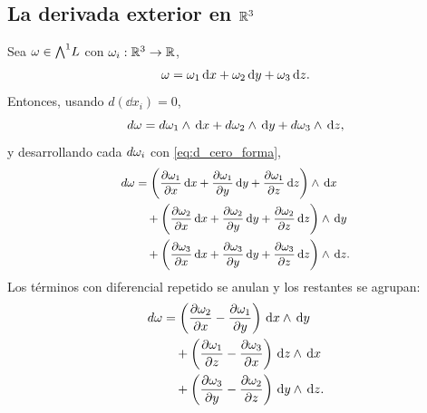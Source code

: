 \subsection{La derivada exterior en $\R^3$}
\label{subsec:derivada_exterior}

Sea $\om\in\Ext{1}$ con $\om_i:\R^3\rightarrow\R$,
\begin{equation}
  \label{eq:uno_forma}
  \om=\om_1\dd x+\om_2\dd y+\om_3\dd z .
\end{equation}
Entonces, usando $d(\dd x_i)=0$,
\begin{equation}
  \label{eq:d_omega_paso1}
  d\om=d\om_1\wedge\dd x+d\om_2\wedge\dd y+d\om_3\wedge\dd z,
\end{equation}
y desarrollando cada $d\om_i$ con \eqref{eq:d_cero_forma},
\begin{equation}
  \label{eq:d_omega_paso2}
  \small
  \begin{aligned}
    d\om&=\qty{\pdv{\om_1}{x}\dd x+\pdv{\om_1}{y}\dd y
              +\pdv{\om_1}{z}\dd z}\wedge\dd x\\
        &\quad+\qty{\pdv{\om_2}{x}\dd x+\pdv{\om_2}{y}\dd y
              +\pdv{\om_2}{z}\dd z}\wedge\dd y\\
        &\quad+\qty{\pdv{\om_3}{x}\dd x+\pdv{\om_3}{y}\dd y
              +\pdv{\om_3}{z}\dd z}\wedge\dd z .
  \end{aligned}
\end{equation}
Los t\'erminos con diferencial repetido se anulan y los restantes se agrupan:
\begin{equation}
  \label{eq:d_omega_rot}
  \begin{aligned}
    d\om&=\qty{\pdv{\om_2}{x}-\pdv{\om_1}{y}}\dd x\wedge\dd y\\
        &\quad+\qty{\pdv{\om_1}{z}-\pdv{\om_3}{x}}\dd z\wedge\dd x\\
        &\quad+\qty{\pdv{\om_3}{y}-\pdv{\om_2}{z}}\dd y\wedge\dd z .
  \end{aligned}
\end{equation}

